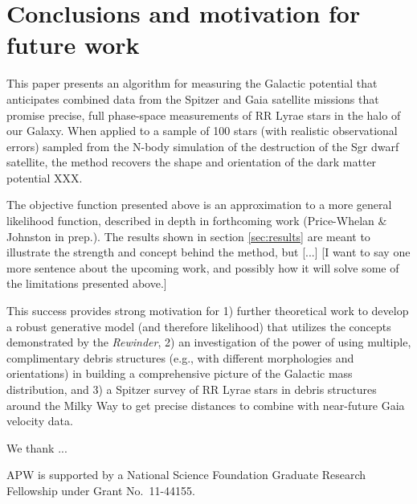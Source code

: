 \documentclass[preprint]{aastex}
\begin{document}
\section{Conclusions and motivation for future work}
\label{sec:conclusion}

This paper presents an algorithm for measuring the Galactic potential
that anticipates combined data from the Spitzer and Gaia satellite
missions that promise precise, full phase-space measurements of RR
Lyrae stars in the halo of our Galaxy. When applied to a sample of 100
stars (with realistic observational errors) sampled from the
\cite{law10} N-body simulation of the destruction of the Sgr dwarf
satellite, the method recovers the shape and orientation of the dark
matter potential XXX. 

The objective function presented above is an approximation to a more
general likelihood function, described in depth in forthcoming work
(Price-Whelan \& Johnston in prep.). The results shown in section
\ref{sec:results} are meant to illustrate the strength and concept
behind the method, but [...] [I want to say one more sentence about
  the upcoming work, and possibly how it will solve some of the
  limitations presented above.]

This success provides strong motivation for 1)
further theoretical work to develop a robust generative model (and therefore likelihood) that utilizes the concepts demonstrated by the \emph{Rewinder}, 2) an investigation of the power of using multiple, complimentary debris structures (e.g., with different
morphologies and orientations) in building a comprehensive picture of
the Galactic mass distribution, and 3) a Spitzer survey of RR Lyrae
stars in debris structures around the Milky Way to get precise
distances to combine with near-future Gaia velocity data. 

\acknowledgments
We thank ...

APW is supported by a National Science Foundation Graduate Research
Fellowship under Grant No.\ 11-44155.



\end{document}
